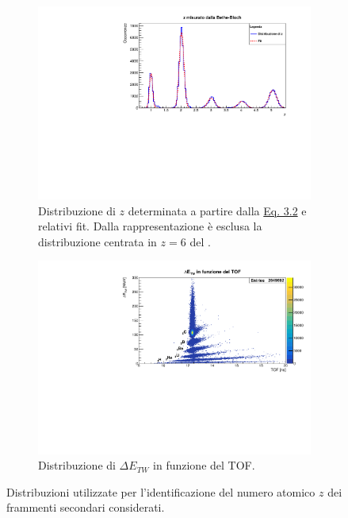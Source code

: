 \documentclass[12pt,a4paper,twoside]{report}
\begin{document}
	\begin{figure}[H]
		\centering
		\begin{subfigure}[t]{1.\textwidth}
			\centering
			\includegraphics[width=\textwidth, scale=0.50]{c_z.pdf}
			\caption{Distribuzione di $z$ determinata a partire dalla \hyperref[eq:atomic_number]{Eq. 3.2} e relativi fit. Dalla rappresentazione è esclusa la distribuzione centrata in $z=6$ del .}
			\label{fig:atomic_numbersa}
		\end{subfigure}
		\par
		\begin{subfigure}[t]{1.\textwidth}
			\centering
			\includegraphics[width=\textwidth, scale=0.50]{c_E_TOF.pdf}
			\caption{Distribuzione di $\Delta E_{TW}$ in funzione del TOF.}
			\label{fig:atomic_numbersb}
		\end{subfigure}
		\caption{Distribuzioni utilizzate per l'identificazione del numero atomico $z$ dei frammenti secondari considerati.}
		\label{fig:atomic_numbers}
	\end{figure}
	
\end{document}
